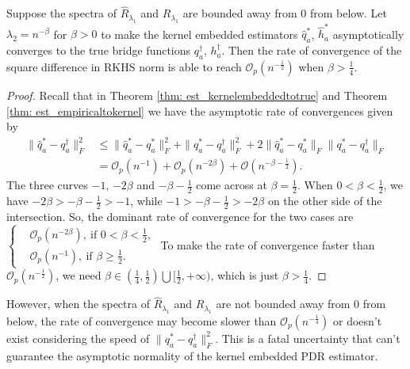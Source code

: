\begin{lemma}

    \label{lem: est_slowrate}
    Suppose the spectra of $\widehat{R}_{\lambda_1}$ and $R_{\lambda_1}$ are bounded away from 0 from below. 
    Let $\lambda_2=n^{-\beta}$ for $\beta>0$ to make the kernel embedded estimators $\widehat{q}_a^*$, $\widehat{h}_a^*$ asymptotically converges to the true bridge functions $q_a^{\dagger}$, $h_a^{\dagger}$. 
    Then the rate of convergence of the square difference in RKHS norm is able to reach $\mathcal{O}_p(n^{-\frac{1}{2}})$ when $\beta>\frac{1}{4}$. 
\end{lemma}
\begin{proof}
    Recall that in Theorem \ref{thm: est_kernelembeddedtotrue} and Theorem \ref{thm: est_empiricaltokernel} 
    we have the asymptotic rate of convergences given by 
    \begin{align*}
        \|\widehat{q}_a^*-q_a^{\dagger}\|^2_F &\leq \|\widehat{q}_a^*-q_a^*\|^2_F + \|q_a^*-q_a^{\dagger}\|^2_F + 2\|\widehat{q}_a^*-q_a^*\|_F\|q_a^*-q_a^{\dagger}\|_F \\
                                              &= \mathcal{O}_p(n^{-1}) + \mathcal{O}_p(n^{-2\beta}) + \mathcal{O}(n^{-\beta-\frac{1}{2}}).
    \end{align*}
    The three curves $-1$, $-2\beta$ and $-\beta-\frac{1}{2}$ come across at $\beta=\frac{1}{2}$. 
    When $0<\beta<\frac{1}{2}$, we have $-2\beta>-\beta-\frac{1}{2}>-1$, while $-1>-\beta-\frac{1}{2}>-2\beta$
    on the other side of the intersection. 
    So, the dominant rate of convergence for the two cases are $\left\{\begin{aligned}
        &\mathcal{O}_p(n^{-2\beta}),\ \text{if }0<\beta<\frac{1}{2}, \\
        &\mathcal{O}_p(n^{-1}),\ \text{if }\beta\geq\frac{1}{2}.
    \end{aligned}\right.$ 
    To make the rate of convergence faster than $\mathcal{O}_p(n^{-\frac{1}{2}})$, 
    we need $\beta\in(\frac{1}{4},\frac{1}{2})\bigcup[\frac{1}{2},+\infty)$, which is just $\beta>\frac{1}{4}$.
\end{proof}

However, when the spectra of $\widehat{R}_{\lambda_1}$ and $R_{\lambda_1}$ are not bounded away from 0 from below, 
the rate of convergence may become slower than $\mathcal{O}_p(n^{-\frac{1}{4}})$ or doesn't exist considering the speed of $\|q_a^*-q_a^{\dagger}\|^2_F$.
This is a fatal uncertainty that can't guarantee the asymptotic normality of the kernel embedded PDR estimator. 

